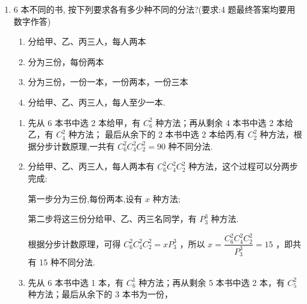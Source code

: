 \begin{enumerate}
\begin{enumerate}
\begin{jieda}
\begin{enumerate}
                \item 分成$(3,5)$两组共有$C_8^3 = 56$种方案，减去其中全男和全女的$C_5^3+C_3^3 = 11$，共$45$种方案

                分成$(4,4)$两组共有$\dfrac{C_8^4C_4^4}{A_2^2} = 35$种方案，减去其中女性都在同一组的$C_3^3C_5^1= 5$种，共$30$种

                再分配，故一共$(45+30)\times A_2^2 = 150$种方案.
            \end{enumerate}
        \end{jieda}
        \item 6 本不同的书, 按下列要求各有多少种不同的分法?(要求:4 题最终答案均要用数字作答)
        \begin{enumerate}
            \item 分给甲、乙、丙三人，每人两本
            \item 分为三份，每份两本
            \item 分为三份，一份一本，一份两本，一份三本
            \item 分给甲、乙、丙三人，每人至少一本.
        \end{enumerate}
        \begin{jieda}
            \begin{enumerate}
                \item 先从 6 本书中选 2 本给甲，有 ${{C}}_{6}^{2}$ 种方法；再从剩余 4 本书中选 2 本给乙，有 ${{C}}_{4}^{2}$ 种方法； 最后从余下的 2 本书中选 2 本给丙,有 ${{C}}_{2}^{2}$ 种方法，根据分步计数原理,一共有 ${{C}}_{6}^{2}{{C}}_{4}^{2}{{C}}_{2}^{2} = {90}$ 种不同分法.
                
                \item 分给甲、乙、丙三人，每人两本有 ${{C}}_{6}^{2}{{C}}_{4}^{2}{{C}}_{2}^{2}$ 种方法，这个过程可以分两步完成:
                
                第一步分为三份,每份两本,设有 $x$ 种方法;
                
                第二步将这三份分给甲、乙、丙三名同学，有 $P_{3}^{3}$ 种方法.
                
                根据分步计数原理，可得 ${{C}}_{6}^{2}{{C}}_{4}^{2}{{C}}_{2}^{2} = xP_{3}^{3}$ ，所以 $x = \dfrac{{{C}}_{6}^{2}{{C}}_{4}^{2}{{C}}_{2}^{2}}{P_{3}^{3}} = {15}$ ，即共有 15 种不同分法.
                
                \item 先从 6 本书中选 1 本，有 ${{C}}_{6}^{1}$ 种方法；再从剩余 5 本书中选 2 本，有 ${{C}}_{5}^{2}$ 种方法；最后从余下的 3 本书为一份，


\end{enumerate}
\end{jieda}
\end{enumerate}
\end{enumerate}
